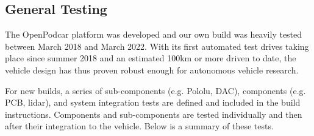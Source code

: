 \documentclass[a4paper]{article}
\begin{document}
	
	\subsection{General Testing}\label{h.wbekh9ay82yu}
	
	
	
	
	
	
	
	The OpenPodcar platform was developed and our own build was heavily tested between March 2018 and March 2022. With its first automated test drives taking place since summer 2018 and an estimated 100km or more driven to date, the vehicle design has thus proven robust enough for autonomous vehicle research. 
	
	For new builds, a series of sub-components (e.g. Pololu, DAC), components (e.g. PCB, lidar), and system integration tests are defined and included in the build instructions. Components and sub-components are tested individually and then after their integration to the vehicle. Below is a summary of these tests.
	
\end{document}

